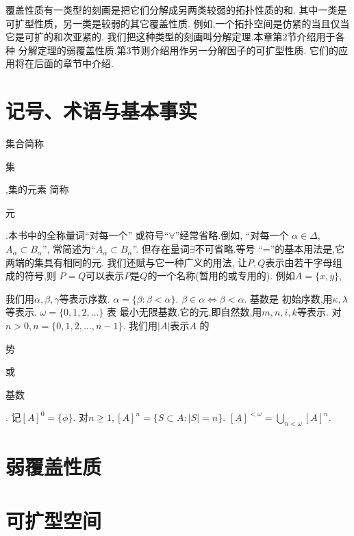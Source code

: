 \documentclass[main.tex]{subfiles}
\begin{document}
	
覆盖性质有一类型的刻画是把它们分解成另两类较弱的拓扑性质的和.
其中一类是可扩型性质，另一类是较弱的其它覆盖性质.
例如,一个拓扑空间是仿紧的当且仅当它是可扩的和次亚紧的.
我们把这种类型的刻画叫分解定理.本章第2节介绍用于各种
分解定理的弱覆盖性质.第3节则介绍用作另一分解因子的可扩型性质.
它们的应用将在后面的章节中介绍.
	
	
\section{记号、术语与基本事实}
集合简称\begin{kaishu}集\end{kaishu},集的元素
简称\begin{kaishu}元\end{kaishu}.本书中的全称量词“对每一个”
或符号“$\forall$”经常省略.倒如, “对每一个
$\alpha\in\Delta$, $A_\alpha \subset B_\alpha$”,
常简述为“$A_\alpha \subset B_\alpha$”.
但存在量词$\exists$不可省略.等号
“=”的基本用法是,它两端的集具有相同的元.
我们还赋与它一种广义的用法, 让$P, Q$表示由若干字母组成的符号,则
$P=Q$可以表示$P$是$Q$的一个名称(暂用的或专用的).
例如$A=\{x,y\}$,
	
我们用$\alpha, \beta, \gamma$等表示序数. $\alpha = \{\beta: \beta < \alpha\}$. $\beta \in \alpha \Leftrightarrow\beta<\alpha$. 基数是
初始序数,用$\kappa,\lambda$ 等表示. $\omega = \{0, 1, 2, \dots\}$ 表
最小无限基数.它的元,即自然数,用$m, n, i , k$等表示.
对$n>0, n = \{0,1,2, \dots, n-1\}$. 我们用$|A|$表示$A$ 
的\begin{kaishu}势\end{kaishu}或\begin{kaishu}基数\end{kaishu}.
记$[A]^0=\{\phi\}$. 对$n\ge1, [A]^n = \{S\subset A: |S| = n\}$.
$[A]^{<\omega} = \bigcup_{n<\omega}[A]^n$.
	
\section{弱覆盖性质}
\section{可扩型空间}
	
\end{document}
